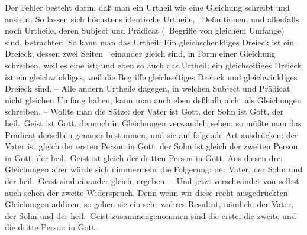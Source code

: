 Der Fehler besteht darin, daß man ein Urtheil wie eine Gleichung schreibt und ansieht. So lassen sich höchstens identische Urtheile, \zB\ Definitionen, und allenfalls noch Urtheile, deren Subject und Prädicat  (\dh\ Begriffe von gleichem Umfange) sind, betrachten. So kann man das Urtheil: Ein gleichschenkliges Dreieck ist ein Dreieck, dessen zwei Seiten~\ einander gleich sind, in Form einer Gleichung schreiben, weil es eine  ist; und eben so auch das Urtheil: ein gleichseitiges Dreieck ist ein gleichwinkliges, weil die Begriffe gleichseitiges Dreieck und gleichwinkliges Dreieck  sind. -- Alle andern Urtheile dagegen, in welchen Subject und Prädicat nicht gleichen Umfang haben, kann man auch eben deßhalb nicht als Gleichungen schreiben. -- Wollte man die Sätze: der Vater ist Gott, der Sohn ist Gott, der heil.\ Geist ist Gott, dennoch in Gleichungen verwandelt sehen: so müßte man das Prädicat derselben genauer bestimmen, und sie auf folgende Art ausdrücken: der Vater ist gleich der ersten Person in Gott; der Sohn ist gleich der zweiten Person in Gott; der heil.\ Geist ist gleich der dritten Person in Gott. Aus diesen drei Gleichungen aber würde sich nimmermehr die Folgerung: der Vater, der Sohn und der heil.\ Geist sind einander gleich, ergeben. -- Und jetzt verschwindet von selbst auch schon der zweite Widerspruch. Denn wenn wir diese recht ausgedrückten Gleichungen addiren, so geben sie ein sehr wahres Resultat, nämlich: der Vater, der Sohn und der heil.\ Geist zusammengenommen sind die erste, die zweite und die dritte Person in Gott.

